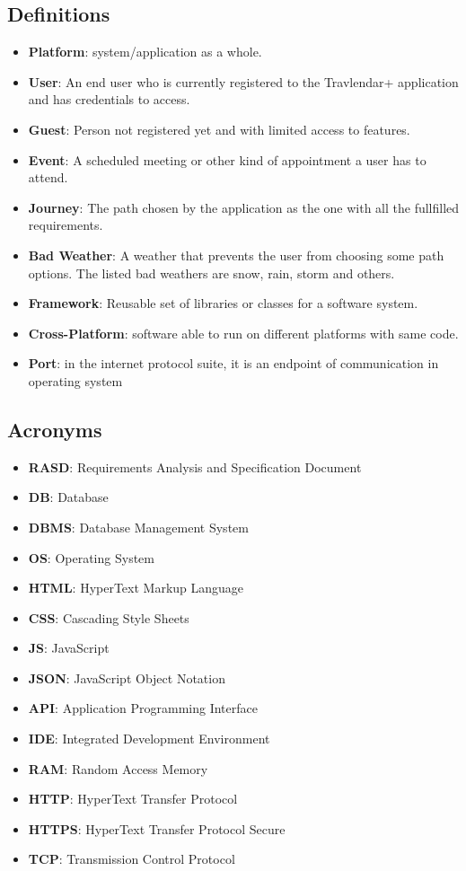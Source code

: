 \documentclass[numbers=noenddot, 12pt, a4paper, oneside]{scrbook}
\begin{document}
\subsection*{Definitions}
\begin{itemize}
	\item \textbf{Platform}: system/application as a whole.
	\item \textbf{User}: An end user who is currently registered to the Travlendar+ application and has credentials to access.
	\item \textbf{Guest}: Person not registered yet and with limited access to features.
	\item \textbf{Event}: A scheduled meeting or other kind of appointment a user has to attend.
	\item \textbf{Journey}: The path chosen by the application as the one with all the fullfilled requirements.
	\item \textbf{Bad Weather}: A weather that prevents the user from choosing some path options. The listed bad weathers are snow, rain, storm and others.
	\item \textbf{Framework}: Reusable set of libraries or classes for a software system.
	\item \textbf{Cross-Platform}: software able to run on different platforms with same code.
	\item \textbf{Port}: in the internet protocol suite, it is an endpoint of communication in operating system
\end{itemize}

\subsection*{Acronyms}

\begin{itemize}
	\item \textbf{RASD}: Requirements Analysis and Specification Document
	\item \textbf{DB}: Database
	\item \textbf{DBMS}: Database Management System
	\item \textbf{OS}: Operating System 
	\item \textbf{HTML}: HyperText Markup Language
	\item \textbf{CSS}: Cascading Style Sheets
	\item \textbf{JS}: JavaScript
	\item \textbf{JSON}: JavaScript Object Notation
	\item \textbf{API}: Application Programming Interface
	\item \textbf{IDE}: Integrated Development Environment
	\item \textbf{RAM}: Random Access Memory
	\item \textbf{HTTP}: HyperText Transfer Protocol
	\item \textbf{HTTPS}: HyperText Transfer Protocol Secure
	\item \textbf{TCP}: Transmission Control Protocol
	
\end{itemize}
\end{document}
